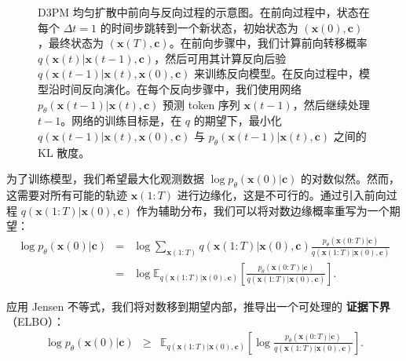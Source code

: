 \documentclass[UTF8,a4paper,zihao=-4,oneside,openany]{ctexbook}
\makeatletter
\newcommand{\AMLFigure}[2][0.96\linewidth]{%
  \begingroup
  \let\AtBeginDocument\@gobble
  \endgroup
}
\makeatother
\begin{document}
\begin{figure}[!t]
\centering
\AMLFigure{figure-d3pm-forward-and-reverse-processes}
\caption{D3PM 均匀扩散中前向与反向过程的示意图。在前向过程中，状态在每个 $\Delta t = 1$ 的时间步跳转到一个新状态，初始状态为 $(\mathbf{x}(0), \mathbf{c})$，最终状态为 $(\mathbf{x}(T), \mathbf{c})$。在前向步骤中，我们计算前向转移概率 $q(\mathbf{x}(t) | \mathbf{x}(t - 1), \mathbf{c})$，然后可用其计算反向后验 $q(\mathbf{x}(t-1)| \mathbf{x}(t),\mathbf{x}(0),\mathbf{c})$ 来训练反向模型。在反向过程中，模型沿时间反向演化。在每个反向步骤中，我们使用网络 $p_\theta(\mathbf{x}(t-1)| \mathbf{x}(t),\mathbf{c})$ 预测 token 序列 $\mathbf{x}(t-1)$，然后继续处理 $t - 1$。网络的训练目标是，在 $q$ 的期望下，最小化 $q(\mathbf{x}(t-1)| \mathbf{x}(t),\mathbf{x}(0),\mathbf{c})$ 与 $p_\theta(\mathbf{x}(t-1)| \mathbf{x}(t),\mathbf{c})$ 之间的 KL 散度。}
\label{fig:d3pm-forward-and-reverse-processes}
\end{figure}

为了训练模型，我们希望最大化观测数据 $\log p_\theta(\mathbf{x}(0) | \mathbf{c})$ 的对数似然。然而，这需要对所有可能的轨迹 $\mathbf{x}(1{:}T)$ 进行边缘化，这是不可行的。通过引入前向过程 $q(\mathbf{x}(1{:}T) | \mathbf{x}(0), \mathbf{c})$ 作为辅助分布，我们可以将对数边缘概率重写为一个期望：
\begin{eqnarray}
\log p_\theta(\mathbf{x}(0) | \mathbf{c}) & = & \log\sum_{\mathbf{x}(1{:}T)} q(\mathbf{x}(1{:}T) | \mathbf{x}(0), \mathbf{c}) \frac{p_\theta(\mathbf{x}(0{:}T) | \mathbf{c})}{q(\mathbf{x}(1{:}T) | \mathbf{x}(0), \mathbf{c})} \nonumber \\
& = & \log \mathbb{E}_{q(\mathbf{x}(1{:}T) | \mathbf{x}(0), \mathbf{c})} \left[ \frac{p_\theta(\mathbf{x}(0{:}T) | \mathbf{c})}{q(\mathbf{x}(1{:}T) | \mathbf{x}(0), \mathbf{c})} \right].
\end{eqnarray}

\noindent 应用 Jensen 不等式，我们将对数移到期望内部，推导出一个可处理的 \textbf{证据下界}（ELBO）：
\begin{eqnarray}
\log p_\theta(\mathbf{x}(0) | \mathbf{c}) & \ge & \mathbb{E}_{q(\mathbf{x}(1{:}T) | \mathbf{x}(0), \mathbf{c})} \left[ \log \frac{p_\theta(\mathbf{x}(0{:}T) | \mathbf{c})}{q(\mathbf{x}(1{:}T) | \mathbf{x}(0), \mathbf{c})} \right].
\end{eqnarray}
\end{document}
